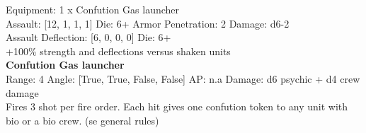 Equipment: 1 x Confution Gas launcher \\

Assault: [12, 1, 1, 1] Die: 6+ Armor Penetration: 2 Damage: d6-2 \\
Assault Deflection: [6, 0, 0, 0] Die: 6+\\
\indent +100\% strength and deflections versus shaken units\\ 
 



{\bf Confution Gas launcher } \\



Range: 4  Angle: [True, True, False, False] AP: n.a Damage: d6 psychic + d4 crew damage \\
Fires 3 shot per fire order. Each hit gives one confution token to any unit with bio or a bio crew. (se general rules)\\ 




 















